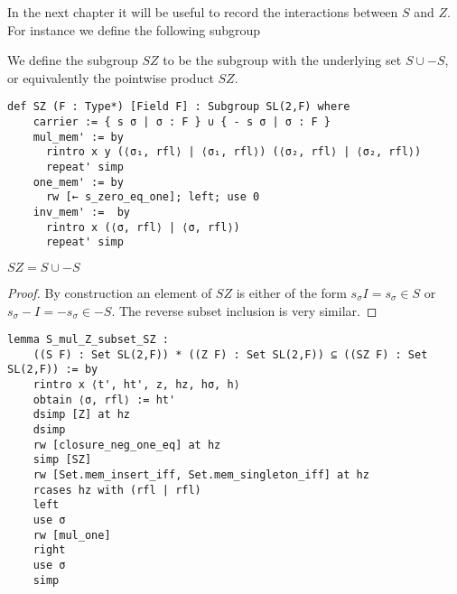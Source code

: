 In the next chapter it will be useful to record the interactions between $S$ and $Z$. 
For instance we define the following subgroup

\begin{definition}
    \label{SpecialSubgroups.SZ}
    \leanok
    We define the subgroup $SZ$ to be the subgroup with the underlying set $S \cup -S$, or equivalently the pointwise product $SZ$.
\end{definition}
\begin{footnotesize}
\begin{verbatim}
def SZ (F : Type*) [Field F] : Subgroup SL(2,F) where
    carrier := { s σ | σ : F } ∪ { - s σ | σ : F }
    mul_mem' := by
      rintro x y (⟨σ₁, rfl⟩ | ⟨σ₁, rfl⟩) (⟨σ₂, rfl⟩ | ⟨σ₂, rfl⟩)
      repeat' simp
    one_mem' := by
      rw [← s_zero_eq_one]; left; use 0
    inv_mem' :=  by
      rintro x (⟨σ, rfl⟩ | ⟨σ, rfl⟩)
      repeat' simp
\end{verbatim}
\end{footnotesize}


\begin{corollary}
\label{SpecialSubgroups.S_mul_Z_subset_SZ}
$SZ = S \cup -S$
\leanok
\end{corollary}
\begin{proof}
\leanok
    By construction an element of $SZ$ is either of the form $s_\sigma  I = s_\sigma \in S$ or $s_\sigma -I = -s_\sigma\in -S$. The reverse subset inclusion is very similar.
\end{proof}
\begin{footnotesize}
\begin{verbatim}
lemma S_mul_Z_subset_SZ :
    ((S F) : Set SL(2,F)) * ((Z F) : Set SL(2,F)) ⊆ ((SZ F) : Set SL(2,F)) := by
    rintro x ⟨t', ht', z, hz, hσ, h⟩
    obtain ⟨σ, rfl⟩ := ht'
    dsimp [Z] at hz
    dsimp
    rw [closure_neg_one_eq] at hz
    simp [SZ]
    rw [Set.mem_insert_iff, Set.mem_singleton_iff] at hz
    rcases hz with (rfl | rfl)
    left
    use σ
    rw [mul_one]
    right
    use σ
    simp
\end{verbatim}
\end{footnotesize}

